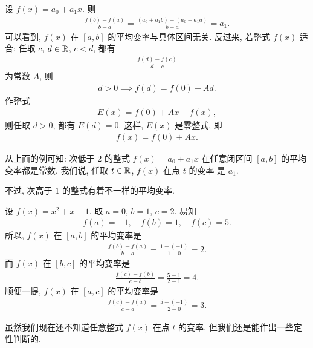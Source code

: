 \begin{example}
    设 $f(x) = a_0 + a_1 x$. 则
    \begin{align*}
        \frac{f(b) - f(a)}{b - a} = \frac{(a_0 + a_1 b) - (a_0 + a_1 a)}{b - a} = a_1.
    \end{align*}
    可以看到, $f(x)$ 在 $[a, b]$ 的平均变率与具体区间无关. 反过来, 若整式 $f(x)$ 适合: 任取 $c$, $d \in \mathbb{R}$, $c < d$, 都有
    \begin{align*}
        \frac{f(d) - f(c)}{d - c}
    \end{align*}
    为常数 $A$, 则
    \begin{align*}
        d > 0 \implies f(d) = f(0) + Ad.
    \end{align*}
    作整式
    \begin{align*}
        E(x) = f(0) + Ax - f(x),
    \end{align*}
    则任取 $d > 0$, 都有 $E(d) = 0$. 这样, $E(x)$ 是零整式, 即
    \begin{align*}
        f(x) = f(0) + Ax.
    \end{align*}
\end{example}

从上面的例可知: 次低于 $2$ 的整式 $f(x) = a_0 + a_1 x$ 在任意闭区间 $[a, b]$ 的平均变率都是常数. 我们说, 任取 $t \in \mathbb{R}$, $f(x)$ 在点 $t$ 的变率  是 $a_1$.

不过, 次高于 $1$ 的整式有着不一样的平均变率.

\begin{example}
    设 $f(x) = x^2 + x - 1$. 取 $a = 0$, $b = 1$, $c = 2$. 易知
    \begin{align*}
        f(a) = -1, \quad f(b) = 1, \quad f(c) = 5.
    \end{align*}
    所以, $f(x)$ 在 $[a, b]$ 的平均变率是
    \begin{align*}
        \frac{f(b) - f(a)}{b - a} = \frac{1 - (-1)}{1 - 0} = 2.
    \end{align*}
    而 $f(x)$ 在 $[b, c]$ 的平均变率是
    \begin{align*}
        \frac{f(c) - f(b)}{c - b} = \frac{5 - 1}{2 - 1} = 4.
    \end{align*}
    顺便一提, $f(x)$ 在 $[a, c]$ 的平均变率是
    \begin{align*}
        \frac{f(c) - f(a)}{c - a} = \frac{5 - (-1)}{2 - 0} = 3.
    \end{align*}
\end{example}

虽然我们现在还不知道任意整式 $f(x)$ 在点 $t$ 的变率, 但我们还是能作出一些定性判断的.

